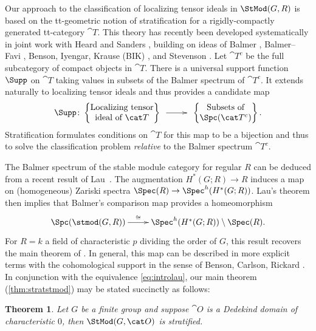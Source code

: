 \documentclass{amsart}%
\numberwithin{equation}{section}%
\newtheorem{thmx}{Theorem}
\theoremstyle{remark}
\begin{document}
Our approach to the classification of localizing tensor ideals in $\StMod(G,R)$ is based on the tt-geometric notion of stratification for a rigidly-compactly generated tt-category $\cat T$. This theory has recently been developed systematically in joint work with Heard and Sanders \cite{bhs1}, building on ideas of Balmer \cite{Balmer05a}, Balmer--Favi \cite{BalmerFavi11}, Benson, Iyengar, Krause (BIK) \cite{BensonIyengarKrause11a,BensonIyengarKrause11b}, and Stevenson \cite{Stevenson13}. Let $\cat T^c$ be the full subcategory of compact objects in $\cat T$. There is a universal support function $\Supp$ on $\cat T$ taking values in subsets of the Balmer spectrum of $\cat T^c$. It extends naturally to localizing tensor ideals and thus provides a candidate map
\[
\Supp\colon\begin{Bmatrix}
\text{Localizing tensor} \\
\text{ideal of } \cat T
\end{Bmatrix} 
\xymatrix@C=2pc{ \ar[r] &}
\begin{Bmatrix}
\text{Subsets of}  \\
\Spc(\cat T^c)
\end{Bmatrix}.
\]
Stratification formulates conditions on $\cat T$ for this map to be a bijection and thus to solve the classification problem \emph{relative} to the Balmer spectrum $\cat T^c$. 

The Balmer spectrum of the stable module category for regular $R$ can be deduced from a recent result of Lau~\cite{lau_spcdmstacks}. The augmentation $H^*(G;R) \to R$ induces a map on (homogeneous) Zariski spectra $\Spec(R) \to \Spec^h(H^*(G;R))$. Lau's theorem then implies that Balmer's comparison map \cite{Balmer10b} provides a homeomorphism 
\begin{equation}\label{eq:introlau}
\xymatrix{\Spc(\stmod(G,R)) \ar[r]^-{\cong} & \Spec^h(H^*(G;R))\setminus\Spec(R).}
\end{equation}
For $R = k$ a field of characteristic $p$ dividing the order of $G$, this result recovers the main theorem of \cite{BensonCarlsonRickard97}. In general, this map can be described in more explicit terms with the cohomological support in the sense of Benson, Carlson, Rickard \cite{BensonCarlsonRickard95, BensonCarlsonRickard96}. In conjunction with the equivalence \eqref{eq:introlau}, our main theorem (\cref{thm:stratstmod}) may be stated succinctly as follows:

\begin{thmx}\label{thm:a}
Let $G$ be a finite group and suppose $\cat O$ is a Dedekind domain of characteristic $0$, then $\StMod(G,\cat O)$ is stratified.
\end{thmx}
\end{document}
